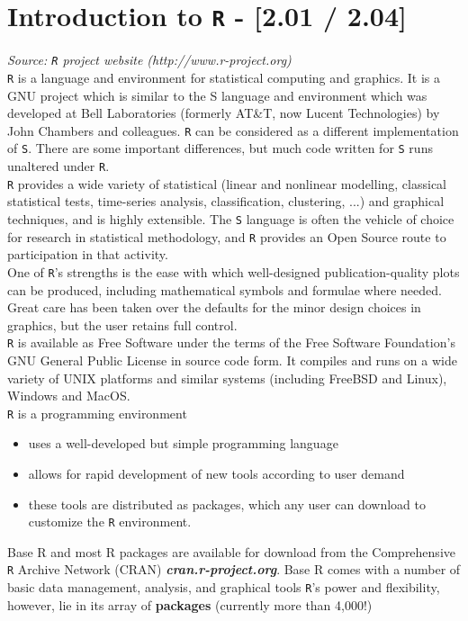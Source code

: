 
\section*{Introduction to \texttt{R} - [2.01 / 2.04]}
\emph{Source: \texttt{R} project website (http://www.r-project.org)}\\

\noindent \texttt{R} is a language and environment for statistical computing and graphics. It is a GNU project which is similar to the S language and environment which was developed at Bell Laboratories (formerly AT\&T, now Lucent Technologies) by John Chambers and colleagues. \texttt{R} can be considered as a different implementation of \texttt{S}. There are some important differences, but much code written for \texttt{S} runs unaltered under \texttt{R}.\\

\noindent \texttt{R} provides a wide variety of statistical (linear and nonlinear modelling, classical statistical tests, time-series analysis, classification, clustering, ...) and graphical techniques, and is highly extensible. The \texttt{S} language is often the vehicle of choice for research in statistical methodology, and \texttt{R} provides an Open Source route to participation in that activity.\\

\noindent One of \texttt{R}'s strengths is the ease with which well-designed publication-quality plots can be produced, including mathematical symbols and formulae where needed. Great care has been taken over the defaults for the minor design choices in graphics, but the user retains full control.\\

\noindent \texttt{R} is available as Free Software under the terms of the Free Software Foundation's GNU General Public License in source code form. It compiles and runs on a wide variety of UNIX platforms and similar systems (including FreeBSD and Linux), Windows and MacOS.\\


\texttt{R} is a programming environment
\begin{itemize}
\item uses a well-developed but simple programming language
\item allows for rapid development of new tools according to user demand
\item these tools are distributed as packages, which any user can download to customize the \texttt{R} environment.
\end{itemize}
Base R and most R packages are available for download from the Comprehensive \texttt{R} Archive Network (CRAN)
\textbf{\textit{cran.r-project.org}}. Base R comes with a number of basic data management, analysis, and graphical tools
\texttt{R}'s power and flexibility, however, lie in its array of \textbf{packages} (currently more than 4,000!)

